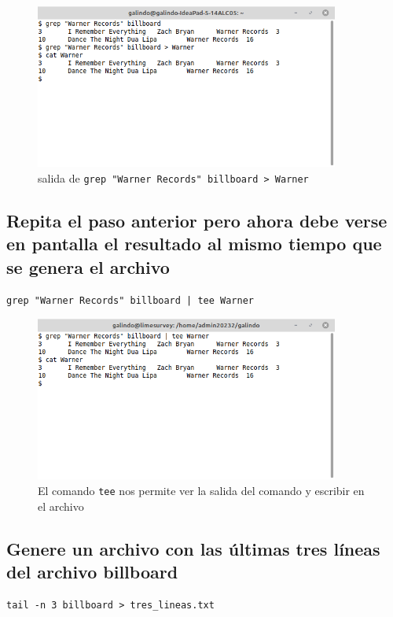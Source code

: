 \documentclass[11pt]{article}
\begin{document}
\begin{figure}[htbp]
\centering
\includegraphics[width=10cm]{img/4.png}
\caption[\texttt{grep "Warner Records" billboard > Warner}]{salida de \texttt{grep "Warner Records" billboard > Warner}}
\end{figure}

\pagebreak

\subsection{Repita el paso anterior pero ahora debe verse en pantalla el resultado al mismo tiempo que se genera el archivo}
\label{sec:orgb5cc61c}

\begin{verbatim}
grep "Warner Records" billboard | tee Warner
\end{verbatim}

\begin{figure}[htbp]
\centering
\includegraphics[width=10cm]{img/5.png}
\caption[\texttt{tee}]{El comando \texttt{tee} nos permite ver la salida del comando y escribir en el archivo}
\end{figure}

\subsection{Genere un archivo con las últimas tres líneas del archivo billboard}
\label{sec:org93dd30a}
\begin{verbatim}
tail -n 3 billboard > tres_lineas.txt
\end{verbatim}
\end{document}
